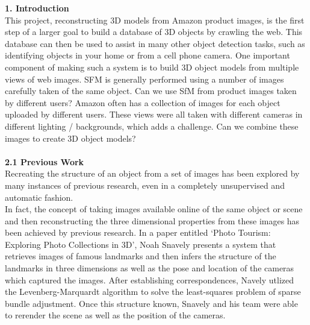 \documentclass[12pt]{article}
\begin{document}
\begin{multicols}{2}
{\noindent \large \textbf{1. Introduction}}\\
This project, reconstructing 3D models from Amazon product images, is the first step of a larger goal to build a database of 3D objects by crawling the web.  This database can then be used to assist in many other object detection tasks, such as identifying objects in your home or from a cell phone camera.  One important component of making such a system is to build 3D object models from multiple views of web images. SFM is generally performed using a number of images carefully taken of the same object.  Can we use SfM from product images taken by different users?  Amazon often has a collection of images for each object uploaded by different users.  These views were all taken with different cameras in different lighting / backgrounds, which adds a challenge.  Can we combine these images to create 3D object models?
\\\\
{\large \textbf{2.1 Previous Work}}\\
Recreating the structure of an object from a set of images has been explored by many instances of previous research, even in a completely unsupervised and automatic fashion. \\
\indent In fact, the concept of taking images available online of the same object or scene and then reconstructing the three dimensional properties from these images has been achieved by previous research. In a paper entitled `Photo Tourism: Exploring Photo Collections in 3D', Noah Snavely presents a system that retrieves images of famous landmarks and then infers the structure of the landmarks in three dimensions as well as the pose and location of the cameras which captured the images. After establishing correspondences, Navely utlized the Levenberg-Marquardt algorithm to solve the least-squares problem of sparse bundle adjustment. Once this structure known, Snavely and his team were able to rerender the scene as well as the position of the cameras. \\

\end{multicols}
\end{document}
